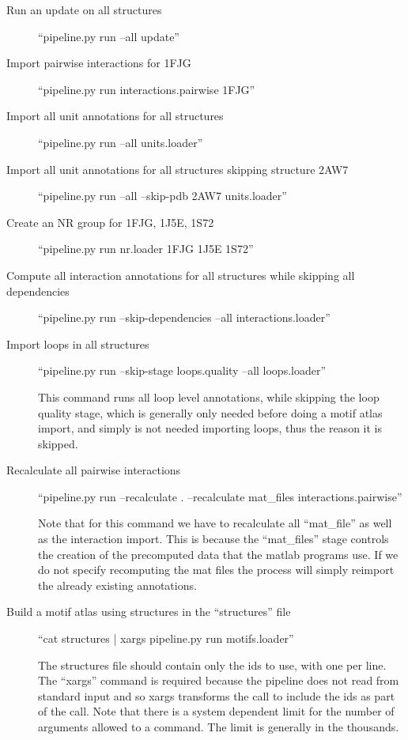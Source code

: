 \begin{description}
  \item [Run an update on all structures]
          ``pipeline.py run --all update''

  \item [Import pairwise interactions for 1FJG]
          ``pipeline.py run interactions.pairwise 1FJG''

  \item [Import all unit annotations for all structures]
          ``pipeline.py run --all units.loader''

  \item [Import all unit annotations for all structures skipping structure 2AW7]
          ``pipeline.py run --all --skip-pdb 2AW7 units.loader''

  \item [Create an NR group for 1FJG, 1J5E, 1S72]
          ``pipeline.py run nr.loader 1FJG 1J5E 1S72''

  \item [Compute all interaction annotations for all structures while skipping all dependencies]
          ``pipeline.py run --skip-dependencies --all interactions.loader''

  \item [Import loops in all structures]
          ``pipeline.py run --skip-stage loops.quality --all loops.loader''

          This command runs all loop level annotations, while skipping the loop quality stage,
          which is generally only needed before doing a motif atlas import, and simply is not
          needed importing loops, thus the reason it is skipped.

  \item [Recalculate all pairwise interactions]
          ``pipeline.py run --recalculate . --recalculate mat\_files interactions.pairwise''

          Note that for this command we have to recalculate all
          ``mat\_file'' as well as the interaction import. This is
          because the ``mat\_files'' stage controls the creation of the
          precomputed data that the matlab programs use. If we do not
          specify recomputing the mat files the process will simply
          reimport the already existing annotations.

  \item [Build a motif atlas using structures in the ``structures'' file]
          ``cat structures | xargs pipeline.py run motifs.loader''

          The structures file should contain only the ids to use, with one
          per line. The ``xargs'' command is required because the pipeline
          does not read from standard input and so xargs transforms the
          call to include the ids as part of the call. Note that there is
          a system dependent limit for the number of arguments allowed to
          a command. The limit is generally in the thousands.
\end{description}

